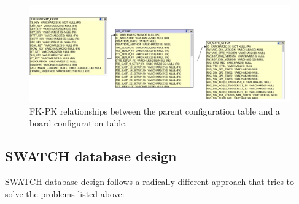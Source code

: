 \documentclass[a4paper]{jpconf}
\begin{document}
   
\begin{figure}
\begin{center}
\includegraphics[width=150mm,scale=0.5]{figures/Figure3.png}
\end{center}
\caption{\label{label} FK-PK relationships between the parent configuration table and a board configuration table.}
\end{figure}

    
\subsection {SWATCH database design} 

SWATCH database design follows a radically different approach that tries to solve the problems listed above:
\end{document}
